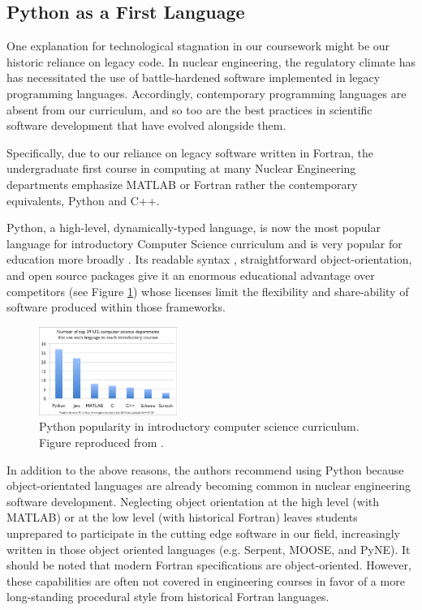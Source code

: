 \documentclass{anstrans}
\begin{document}
\subsection{Python as a First Language}

One explanation for technological stagnation in our coursework might be our
historic reliance on legacy code. In nuclear engineering, the regulatory climate
has has necessitated the use of battle-hardened software implemented in legacy
programming languages. Accordingly, contemporary programming languages are
absent from our curriculum, and so too are the best practices in scientific
software development \cite{wilson_best_2014} that have evolved alongside them.

Specifically, due to our reliance on legacy software written in Fortran, the
undergraduate first course in computing at many Nuclear Engineering departments
emphasize MATLAB or Fortran rather the contemporary equivalents, Python and C++.

Python, a high-level, dynamically-typed language, is now the most popular
language for introductory Computer Science curriculum \cite{guo_python_2014} and
is very popular for education more broadly
\cite{myers_python_2007,stajano_python_2000,backer_computational_2007}. Its
readable syntax \cite{stefik_empirical_2013}, straightforward
object-orientation, and open source packages give it an enormous educational
advantage over competitors (see Figure \ref{fig:guo}) whose licenses limit the
flexibility and share-ability of software produced within those frameworks.

\begin{figure}[htbp!]
\begin{center}
\includegraphics[width=0.4\textwidth]{guo.eps}
\end{center}
\caption{Python popularity in introductory computer science curriculum. Figure
reproduced from \cite{guo_python_2014}. }
\label{fig:guo}
\end{figure}


In addition to the above reasons, the authors recommend using Python
because object-orientated languages are already becoming common in nuclear
engineering software development.  Neglecting object orientation at the high
level (with MATLAB) or at the low level (with historical Fortran) leaves students
unprepared to participate in the cutting edge software in our field,
increasingly written in those object oriented languages (e.g.
Serpent\cite{leppanen_serpentcontinuous-energy_2013}, 
MOOSE\cite{gaston_moose:_2009}, and
PyNE\cite{scopatz_pyne:_2012}). It should be noted that modern Fortran specifications 
are object-oriented.  However, these capabilities are often not covered in 
engineering courses in favor of a more long-standing procedural style from historical
Fortran languages.
\end{document}

